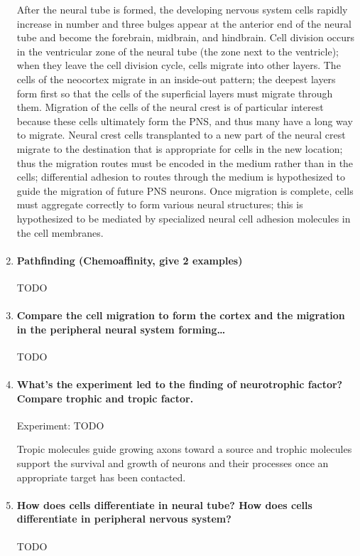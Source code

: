\documentclass[12pt,article,oneside,a4paper]{memoir}
\begin{document}
\begin{enumerate}
After the neural tube is formed, the developing nervous system cells rapidly increase in number and three bulges appear at the anterior end of the neural tube and become the forebrain, midbrain, and hindbrain. Cell division occurs in the ventricular zone of the neural tube (the zone next to the ventricle); when they leave the cell division cycle, cells migrate into other layers. The cells of the neocortex migrate in an inside-out pattern; the deepest layers form first so that the cells of the superficial layers must migrate through them. Migration of the cells of the neural crest is of particular interest because these cells ultimately form the PNS, and thus many have a long way to migrate. Neural crest cells transplanted to a new part of the neural crest migrate to the destination that is appropriate for cells in the new location; thus the migration routes must be encoded in the medium rather than in the cells; differential adhesion to routes through the medium is hypothesized to guide the migration of future PNS neurons. Once migration is complete, cells must aggregate correctly to form various neural structures; this is hypothesized to be mediated by specialized neural cell adhesion molecules in the cell membranes.

\item \paragraph{Pathfinding (Chemoaffinity, give 2 examples)}
TODO

\item \paragraph{Compare the cell migration to form the cortex and the migration in the peripheral neural system forming…}
TODO

\item \paragraph{What’s the experiment led to the finding of neurotrophic factor? Compare trophic and tropic factor.}
Experiment: TODO

Tropic molecules guide growing axons toward a source and trophic molecules support the survival and growth of neurons and their processes once an appropriate target has been contacted.

\item \paragraph{How does cells differentiate in neural tube? How does cells differentiate in peripheral nervous system?}
TODO


\end{enumerate}
\end{document}
